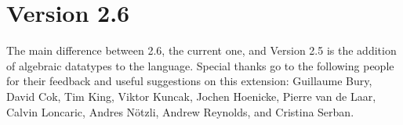 \section*{Version 2.6}

The main difference between 2.6, the current one, and Version 2.5 is the addition of algebraic datatypes to the language.
Special thanks go to the following people
for their feedback and useful suggestions on this extension:
Guillaume Bury,
David Cok,
Tim King,
Viktor Kuncak,
Jochen Hoenicke,
Pierre van de Laar,
Calvin Loncaric,
Andres Nötzli,
Andrew Reynolds,
and
Cristina Serban.

\section*{\thisversion}

